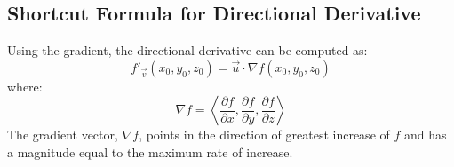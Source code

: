 \documentclass[a4paper,12pt,openany]{book}
\begin{document}
\subsection{Shortcut Formula for Directional Derivative}
Using the gradient, the directional derivative can be computed as:
\[
    f'_{\vec{v}}(x_0, y_0, z_0) = \vec{u} \cdot \nabla f(x_0, y_0, z_0)
\]
where:
\[
    \nabla f = \left\langle \frac{\partial f}{\partial x}, \frac{\partial f}{\partial y}, \frac{\partial f}{\partial z} \right\rangle
\]
The gradient vector, \(\nabla f\), points in the direction of greatest increase of \(f\) and has a magnitude equal to the maximum rate of increase.
\end{document}
